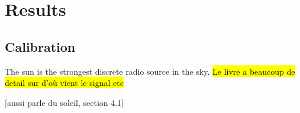 \section{Results}
\subsection{Calibration}
The sun is the strongest discrete radio source in the sky\cite{burke_introduction_2013}. \hl{Le livre a beaucoup de detail sur d'où vient le signal etc}

[aussi \cite{lauterbach_radio_2022} parle du soleil, section 4.1]